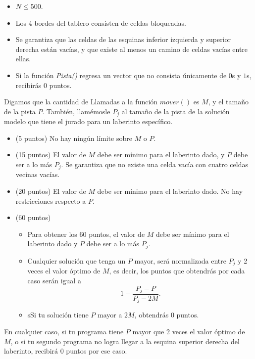 \documentclass[12pt]{scrartcl}
\begin{document}
        \begin{itemize}
            \item $N \le 500$.
            \item Los 4 bordes del tablero consisten de celdas bloqueadas.
            \item Se garantiza que las celdas de las esquinas inferior izquierda y superior derecha están vacías, y que existe al menos un camino de celdas vacías entre ellas.
            \item Si la función \textit{Pista()} regresa un vector que no consista únicamente de $0$s y $1$s, recibirás 0 puntos.
        \end{itemize}
        

    Digamos que la cantidad de Llamadas a la función $mover()$ es $M$, y el tamaño de la pista $P$.
    También, llamémosle $P_j$ al tamaño de la pista de la solución modelo que tiene el jurado para un laberinto específico. 

    \begin{itemize}
        \item (5 puntos) No hay ningún límite sobre $M$ o $P$.
        \item (15 puntos) El valor de $M$ debe ser mínimo para el laberinto dado, y $P$ debe ser a lo más $P_j$. Se garantiza que no existe una celda vacía con cuatro celdas vecinas vacías.
        \item (20 puntos) El valor de $M$ debe ser mínimo para el laberinto dado. No hay restricciones respecto a $P$.
        \item (60 puntos) 
        \begin{itemize}
            \item Para obtener los 60 puntos, el valor de $M$ debe ser mínimo para el laberinto dado y $P$ debe ser a lo más  $P_j$.
            \item Cualquier solución que tenga un $P$ mayor, será normalizada entre $P_j$ y 2 veces el valor óptimo de $M$, es decir, los puntos que obtendrás por cada caso serán igual a
            \[1 - \frac{P_j - P}{P_j - 2M}.\]
            \item sSi tu solución tiene $P$ mayor a $2M$, obtendrás 0 puntos.
        \end{itemize}
    \end{itemize}
    En cualquier caso, si tu programa tiene $P$ mayor que 2 veces el valor óptimo de $M$, o si tu segundo programa no logra llegar a la esquina superior derecha del laberinto, recibirá 0 puntos por ese caso.
\end{document}
